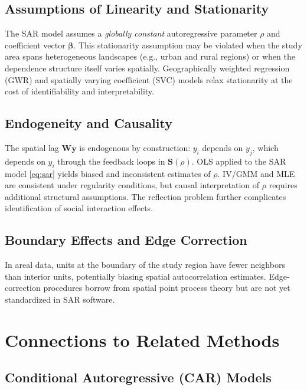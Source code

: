 \documentclass[conference]{IEEEtran}
\theoremstyle{definition}
\begin{document}
\subsection{Assumptions of Linearity and Stationarity}

The SAR model assumes a \emph{globally constant} autoregressive parameter $\rho$ and coefficient vector $\bm{\beta}$. This stationarity assumption may be violated when the study area spans heterogeneous landscapes (e.g., urban and rural regions) or when the dependence structure itself varies spatially. Geographically weighted regression (GWR) \cite{fotheringham2002geographically} and spatially varying coefficient (SVC) models relax stationarity at the cost of identifiability and interpretability.

\subsection{Endogeneity and Causality}

The spatial lag $\mathbf{W}\mathbf{y}$ is endogenous by construction: $y_i$ depends on $y_j$, which depends on $y_i$ through the feedback loops in $\mathbf{S}(\rho)$. OLS applied to the SAR model \eqref{eq:sar} yields biased and inconsistent estimates of $\rho$. IV/GMM and MLE are consistent under regularity conditions, but causal interpretation of $\rho$ requires additional structural assumptions. The reflection problem \cite{manski1993identification} further complicates identification of social interaction effects.

\subsection{Boundary Effects and Edge Correction}

In areal data, units at the boundary of the study region have fewer neighbors than interior units, potentially biasing spatial autocorrelation estimates. Edge-correction procedures borrow from spatial point process theory \cite{cressie1993statistics} but are not yet standardized in SAR software.

\section{Connections to Related Methods}
\label{sec:related}

\subsection{Conditional Autoregressive (CAR) Models}
\end{document}
